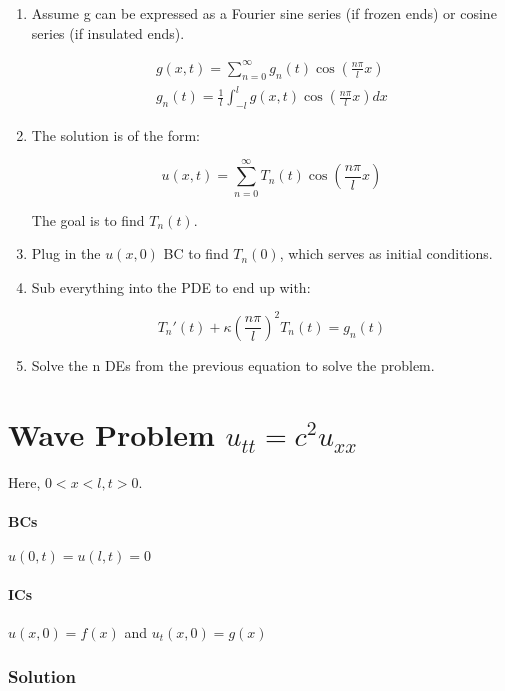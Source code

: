 \documentclass[11pt]{article}
\begin{document}
\begin{enumerate}

\item Assume g can be expressed as a Fourier sine series (if frozen ends) or cosine series (if insulated ends).

\begin{align*}
g(x,t) = \sum \limits_{n=0}^{\infty} g_n(t) \cos(\frac{n\pi}{l}x) \\
g_n(t) = \frac{1}{l} \int_{-l}^{l} g(x,t) \cos(\frac{n\pi}{l}x) dx
\end{align*}

\item The solution is of the form:

$$ u(x,t) = \sum \limits_{n=0}^{\infty} T_n(t) \cos(\frac{n\pi}{l}x) $$

The goal is to find $T_n(t)$.

\item Plug in the $u(x,0)$ BC to find $T_n(0)$, which serves as initial conditions.

\item Sub everything into the PDE to end up with:

$$ T_n'(t) + \kappa (\frac{n\pi}{l})^2 T_n(t) = g_n(t) $$

\item Solve the n DEs from the previous equation to solve the problem.

\end{enumerate}


\section{Wave Problem $u_{tt}=c^2u_{xx}$}
Here, $0<x<l, t>0$.
\paragraph{BCs} $u(0,t) = u(l,t) = 0$
\paragraph{ICs} $u(x,0) = f(x)$ and $u_t(x,0) = g(x)$

\subsubsection*{Solution}
\end{document}
